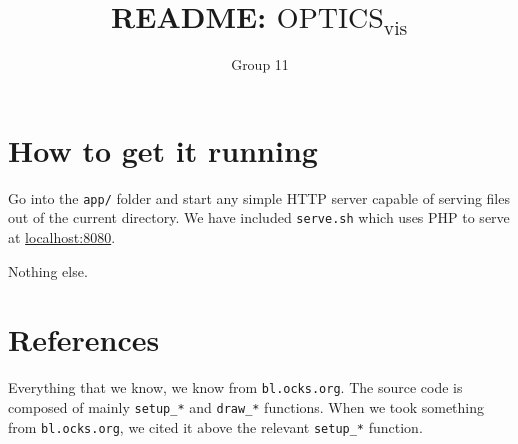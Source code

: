 \documentclass[english]{scrartcl}
\begin{document}
\title{README: $\text{OPTICS}_\text{vis}$}

\author{Group 11}

\maketitle

\section{How to get it running}

Go into the \texttt{app/} folder and start any simple HTTP server capable of
serving files out of the current directory. We have included \texttt{serve.sh}
which uses PHP to serve at \href{http://localhost:8080}{localhost:8080}.

Nothing else.

\section{References}

Everything that we know, we know from \texttt{bl.ocks.org}. The source code
is composed of mainly \texttt{setup\_*} and \texttt{draw\_*} functions.
When we took something from \texttt{bl.ocks.org}, we cited it above the
relevant \texttt{setup\_*} function.
\end{document}
